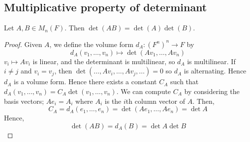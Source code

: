 \subsection{Multiplicative property of determinant}
\begin{lemma}
	Let \( A, B \in M_n(F) \).
	Then \( \det(AB) = \det(A) \det(B) \).
\end{lemma}
\begin{proof}
	Given \( A \), we define the volume form \( d_A \colon (F^n)^n \to F \) by
	\[
		d_A(v_1, \dots, v_n) \mapsto \det(A v_1, \dots, A v_n)
	\]
	\( v_i \mapsto A v_i \) is linear, and the determinant is multilinear, so \( d_A \) is multilinear.
	If \( i \neq j \) and \( v_i = v_j \), then \( \det(\dots, A v_i, \dots, A v_j, \dots) = 0 \) so \( d_A \) is alternating.
	Hence \( d_A \) is a volume form.
	Hence there exists a constant \( C_A \) such that \( d_A(v_1, \dots, v_n) = C_A \det(v_1, \dots, v_n) \).
	We can compute \( C_A \) by considering the basis vectors; \( A e_i = A_i \) where \( A_i \) is the \( i \)th column vector of \( A \).
	Then,
	\[
		C_A = d_A(e_1, \dots, e_n) = \det(Ae_1, \dots, Ae_n) = \det A
	\]
	Hence,
	\[
		\det(AB) = d_A(B) = \det A \det B
	\]
\end{proof}

